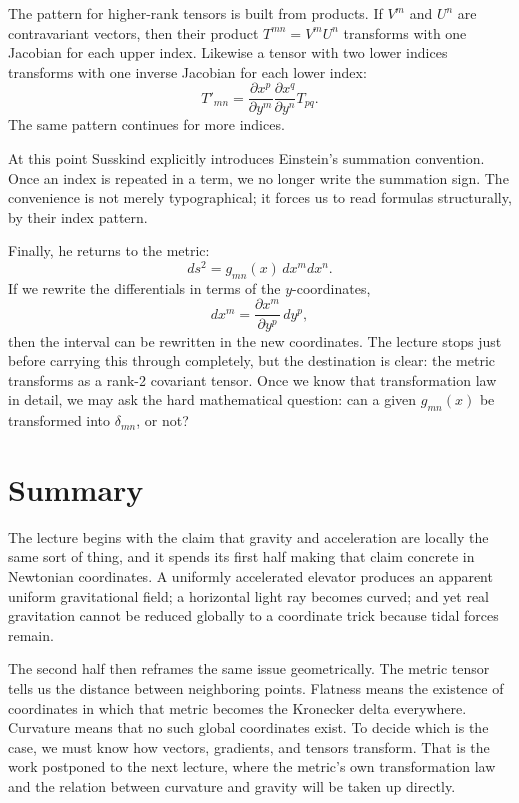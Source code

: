 The pattern for higher-rank tensors is built from products.  If \(V^m\) and \(U^n\) are contravariant vectors, then their product \(T^{mn}=V^mU^n\) transforms with one Jacobian for each upper index.  Likewise a tensor with two lower indices transforms with one inverse Jacobian for each lower index:
\begin{equation}
T'_{mn} = \frac{\partial x^p}{\partial y^m}\frac{\partial x^q}{\partial y^n}T_{pq}.
\end{equation}
The same pattern continues for more indices.

At this point Susskind explicitly introduces Einstein's summation convention.  Once an index is repeated in a term, we no longer write the summation sign.  The convenience is not merely typographical; it forces us to read formulas structurally, by their index pattern.

Finally, he returns to the metric:
\begin{equation}
ds^2 = g_{mn}(x)\,dx^m dx^n.
\end{equation}
If we rewrite the differentials in terms of the \(y\)-coordinates,
\begin{equation}
dx^m = \frac{\partial x^m}{\partial y^p}\,dy^p,
\end{equation}
then the interval can be rewritten in the new coordinates.  The lecture stops just before carrying this through completely, but the destination is clear: the metric transforms as a rank-2 covariant tensor.  Once we know that transformation law in detail, we may ask the hard mathematical question: can a given \(g_{mn}(x)\) be transformed into \(\delta_{mn}\), or not?

\section{Summary}

The lecture begins with the claim that gravity and acceleration are locally the same sort of thing, and it spends its first half making that claim concrete in Newtonian coordinates.  A uniformly accelerated elevator produces an apparent uniform gravitational field; a horizontal light ray becomes curved; and yet real gravitation cannot be reduced globally to a coordinate trick because tidal forces remain.

The second half then reframes the same issue geometrically.  The metric tensor tells us the distance between neighboring points.  Flatness means the existence of coordinates in which that metric becomes the Kronecker delta everywhere.  Curvature means that no such global coordinates exist.  To decide which is the case, we must know how vectors, gradients, and tensors transform.  That is the work postponed to the next lecture, where the metric's own transformation law and the relation between curvature and gravity will be taken up directly.